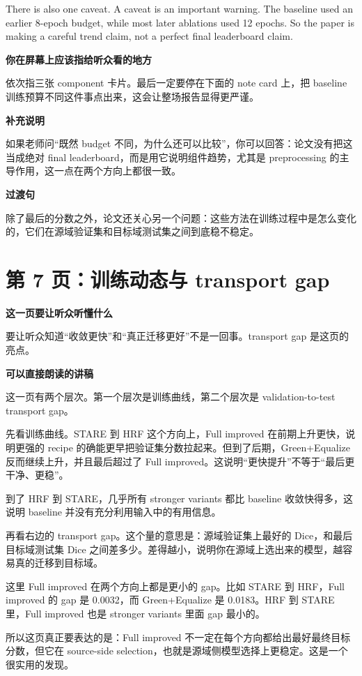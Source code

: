 \documentclass[12pt,a4paper]{ctexart}
\begin{document}
There is also one caveat. A caveat is an important warning. The baseline used an earlier 8-epoch budget, while most later ablations used 12 epochs. So the paper is making a careful trend claim, not a perfect final leaderboard claim.

\textbf{你在屏幕上应该指给听众看的地方}

依次指三张 component 卡片。最后一定要停在下面的 note card 上，把 baseline 训练预算不同这件事点出来，这会让整场报告显得更严谨。

\textbf{补充说明}

如果老师问“既然 budget 不同，为什么还可以比较”，你可以回答：论文没有把这当成绝对 final leaderboard，而是用它说明组件趋势，尤其是 preprocessing 的主导作用，这一点在两个方向上都很一致。

\textbf{过渡句}

除了最后的分数之外，论文还关心另一个问题：这些方法在训练过程中是怎么变化的，它们在源域验证集和目标域测试集之间到底稳不稳定。

\section*{第 7 页：训练动态与 transport gap}

\textbf{这一页要让听众听懂什么}

要让听众知道“收敛更快”和“真正迁移更好”不是一回事。transport gap 是这页的亮点。

\textbf{可以直接朗读的讲稿}

这一页有两个层次。第一个层次是训练曲线，第二个层次是 validation-to-test transport gap。

先看训练曲线。STARE 到 HRF 这个方向上，Full improved 在前期上升更快，说明更强的 recipe 的确能更早把验证集分数拉起来。但到了后期，Green+Equalize 反而继续上升，并且最后超过了 Full improved。这说明“更快提升”不等于“最后更干净、更稳”。

到了 HRF 到 STARE，几乎所有 stronger variants 都比 baseline 收敛快得多，这说明 baseline 并没有充分利用输入中的有用信息。

再看右边的 transport gap。这个量的意思是：源域验证集上最好的 Dice，和最后目标域测试集 Dice 之间差多少。差得越小，说明你在源域上选出来的模型，越容易真的迁移到目标域。

这里 Full improved 在两个方向上都是更小的 gap。比如 STARE 到 HRF，Full improved 的 gap 是 0.0032，而 Green+Equalize 是 0.0183。HRF 到 STARE 里，Full improved 也是 stronger variants 里面 gap 最小的。

所以这页真正要表达的是：Full improved 不一定在每个方向都给出最好最终目标分数，但它在 source-side selection，也就是源域侧模型选择上更稳定。这是一个很实用的发现。
\end{document}
